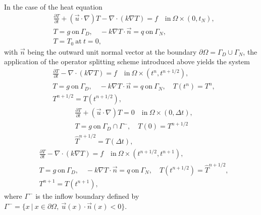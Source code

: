 \begin{versiona}
In the case of the heat equation  
\begin{equation}
\begin{split}
&\frac{\partial T}{\partial t}+(\vec u\cdot\nabla) T-\nabla\cdot(k\nabla T) = 
f \quad \mathrm{in}\ \Omega \times (0,t_N), \\
&T = g  \ \mathrm{on}\ \Gamma_D, \quad  
-k\nabla T \cdot \vec n = q \ \mathrm{on}\ \Gamma_N, \\  
&T = T_0 \ \mathrm{at}\ t=0, 
\end{split}
\end{equation}
with $\vec n$ being the outward unit normal vector at the boundary 
$\partial\Omega=\Gamma_D \cup \Gamma_N$, the application of the operator 
splitting scheme introduced above yields the system 
\begin{equation}
\begin{split}
&\frac{\partial T}{\partial t}-\nabla\cdot(k\nabla T) = f \quad \mathrm{in}\ 
\Omega\times(t^n,t^{n+1/2}), \\
&T=g \ \mathrm{on}\ \Gamma_D, \quad
-k\nabla T \cdot \vec n = q \ \mathrm{on}\ \Gamma_N, \quad T(t^n)=T^n, \\ 
&T^{n+1/2}=T(t^{n+1/2}),
\end{split}
\end{equation}
\begin{equation}\label{transportequation}
\begin{split}
&\frac{\partial T}{\partial t}+(\vec u\cdot\nabla) T = 0 \quad \mathrm{in}\ 
\Omega \times (0,\Delta t), \\ 
&T=g \ \mathrm{on}\ \Gamma_D \cap \Gamma^-, \quad T(0)=T^{n+1/2} \\
&\hat{T}^{n+1/2}=T(\Delta t),
\end{split}
\end{equation}
\begin{equation}
\begin{split}
&\frac{\partial T}{\partial t}-\nabla\cdot(k\nabla T) = f \quad \mathrm{in}\ 
\Omega\times(t^{n+1/2},t^{n+1}), \\ 
&T=g \ \mathrm{on}\ \Gamma_D, \quad 
-k\nabla T \cdot \vec n = q \ \mathrm{on}\ \Gamma_N, \quad
T(t^{n+1/2})=\hat{T}^{n+1/2},\\
&T^{n+1}=T(t^{n+1}),
\end{split}
\end{equation}
where $\Gamma^-$ is the inflow boundary defined by $\Gamma^- = \{ x\ \vert\ 
x \in \partial\Omega,\ \vec u(x)\cdot \vec n(x) < 0 \}$.


\end{versiona}
